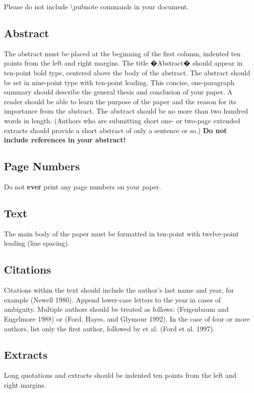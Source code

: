 \documentclass[letterpaper]{article}
\begin{document}
Please do not include \textbackslash pubnote commands in your document.

\subsection{Abstract}
The abstract must be placed at the beginning of the first column, indented ten points from the left and right margins. The title �Abstract� should appear in ten-point bold type, centered above the body of the abstract. The abstract should be set in nine-point type with ten-point leading. This concise, one-paragraph summary should describe the general thesis and conclusion of your paper. A reader should be able to learn the purpose of the paper and the reason for its importance from the abstract. The abstract should be no more than two hundred words in length. (Authors who are submitting short one- or two-page extended extracts should provide a short abstract of only a sentence or so.) \textbf{Do not include references in your abstract!}

\subsection{Page Numbers}

Do not \textbf{ever} print any page numbers on your paper. 

\subsection{Text }
The main body of the paper must be formatted in ten-point with twelve-point leading (line spacing).

\subsection{Citations}
Citations within the text should include the author's last name and year, for example (Newell 1980). Append lower-case letters to the year in cases of ambiguity. Multiple authors should be treated as follows: (Feigenbaum and Engelmore 1988) or (Ford, Hayes, and Glymour 1992). In the case of four or more authors, list only the first author, followed by et al. (Ford et al. 1997).

\subsection{Extracts}
Long quotations and extracts should be indented ten points from the left and right margins. 
\end{document}
